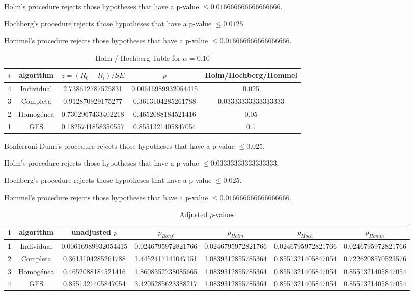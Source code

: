 \documentclass[a4paper,10pt]{article}
\begin{document}
\begin{landscape}
Holm's procedure rejects those hypotheses that have a p-value $\le0.016666666666666666$.


Hochberg's procedure rejects those hypotheses that have a p-value $\le0.0125$.


Hommel's procedure rejects those hypotheses that have a p-value $\le0.016666666666666666$.


\begin{table}[!htp]
\centering\tiny
\caption{Holm / Hochberg Table for $\alpha=0.10$}
\begin{tabular}{ccccc}
$i$&algorithm&$z=(R_0 - R_i)/SE$&$p$&Holm/Hochberg/Hommel\\
\hline
4&Individual&2.738612787525831&0.00616989932054415&0.025\\
3&Completa&0.912870929175277&0.3613104285261788&0.03333333333333333\\
2&Homogénea&0.7302967433402218&0.4652088184521416&0.05\\
1&GFS&0.1825741858350557&0.8551321405847054&0.1\\
\hline
\end{tabular}
\end{table}
Bonferroni-Dunn's procedure rejects those hypotheses that have a p-value $\le0.025$.


Holm's procedure rejects those hypotheses that have a p-value $\le0.03333333333333333$.


Hochberg's procedure rejects those hypotheses that have a p-value $\le0.025$.


Hommel's procedure rejects those hypotheses that have a p-value $\le0.016666666666666666$.


\begin{table}[!htp]
\centering\tiny
\caption{Adjusted $p$-values}
\begin{tabular}{ccccccc}
i&algorithm&unadjusted $p$&$p_{Bonf}$&$p_{Holm}$&$p_{Hoch}$&$p_{Homm}$\\
\hline
1&Individual&0.00616989932054415&0.0246795972821766&0.0246795972821766&0.0246795972821766&0.0246795972821766\\
2&Completa&0.3613104285261788&1.4452417141047151&1.0839312855785364&0.8551321405847054&0.7226208570523576\\
3&Homogénea&0.4652088184521416&1.8608352738085665&1.0839312855785364&0.8551321405847054&0.8551321405847054\\
4&GFS&0.8551321405847054&3.4205285623388217&1.0839312855785364&0.8551321405847054&0.8551321405847054\\
\hline
\end{tabular}
\end{table}


\end{landscape}
\end{document}
